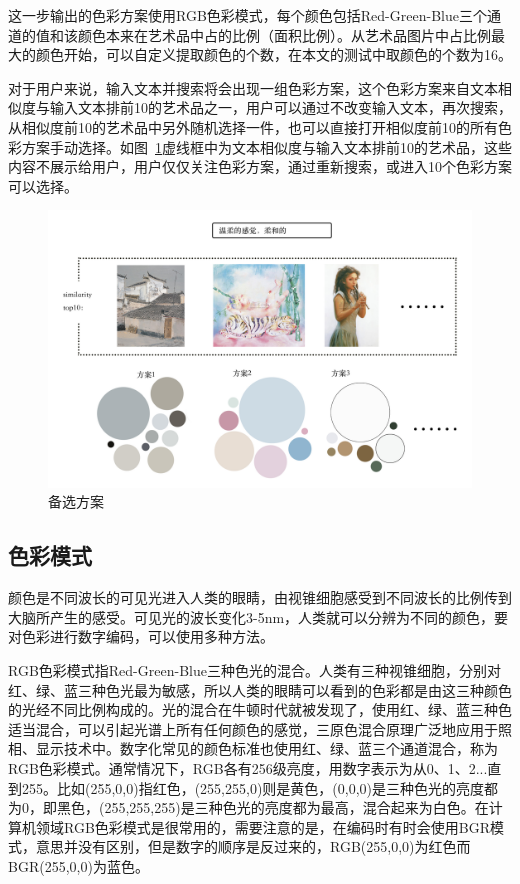 这一步输出的色彩方案使用RGB色彩模式，每个颜色包括Red-Green-Blue三个通道的值和该颜色本来在艺术品中占的比例（面积比例）。从艺术品图片中占比例最大的颜色开始，可以自定义提取颜色的个数，在本文的测试中取颜色的个数为16。

对于用户来说，输入文本并搜索将会出现一组色彩方案，这个色彩方案来自文本相似度与输入文本排前10的艺术品之一，用户可以通过不改变输入文本，再次搜索，从相似度前10的艺术品中另外随机选择一件，也可以直接打开相似度前10的所有色彩方案手动选择。如图~\ref{figure:搜索结果}虚线框中为文本相似度与输入文本排前10的艺术品，这些内容不展示给用户，用户仅仅关注色彩方案，通过重新搜索，或进入10个色彩方案可以选择。

\begin{figure}[!htbp]
\centering
\includegraphics[width=\linewidth,keepaspectratio]{data/chapter-1/搜索结果.jpg}
\caption{备选方案}
\label{figure:搜索结果}
\end{figure}

\subsection{色彩模式}

颜色是不同波长的可见光进入人类的眼睛，由视锥细胞感受到不同波长的比例传到大脑所产生的感受。可见光的波长变化3-5nm，人类就可以分辨为不同的颜色，要对色彩进行数字编码，可以使用多种方法。\cite{colormodel}

RGB色彩模式指Red-Green-Blue三种色光的混合。人类有三种视锥细胞，分别对红、绿、蓝三种色光最为敏感，所以人类的眼睛可以看到的色彩都是由这三种颜色的光经不同比例构成的。光的混合在牛顿时代就被发现了，使用红、绿、蓝三种色适当混合，可以引起光谱上所有任何颜色的感觉，三原色混合原理广泛地应用于照相、显示技术中。数字化常见的颜色标准也使用红、绿、蓝三个通道混合，称为RGB色彩模式。通常情况下，RGB各有256级亮度，用数字表示为从0、1、2...直到255。比如(255,0,0)指红色，(255,255,0)则是黄色，(0,0,0)是三种色光的亮度都为0，即黑色，(255,255,255)是三种色光的亮度都为最高，混合起来为白色。在计算机领域RGB色彩模式是很常用的，需要注意的是，在编码时有时会使用BGR模式，意思并没有区别，但是数字的顺序是反过来的，RGB(255,0,0)为红色而BGR(255,0,0)为蓝色。

